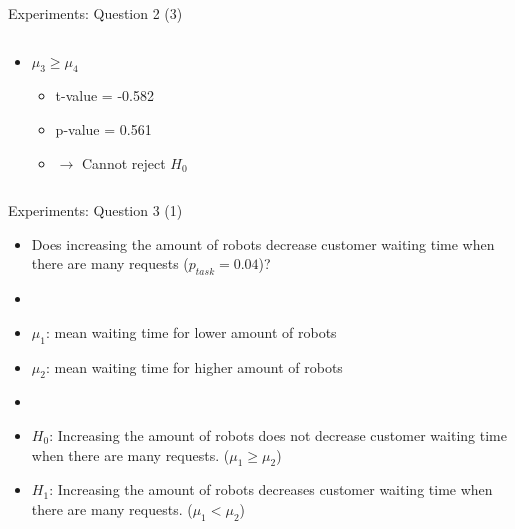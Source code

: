 \begin{frame}{Experiments: Question 2 (3)}
\begin{columns}
\begin{column}{0.5\textwidth}
\begin{itemize}
                \item $\mu_3 \geq \mu_4$
                    \begin{itemize}
                        \item t-value = -0.582
                        \item p-value = 0.561
                        \item $\rightarrow$ Cannot reject $H_0$
                    \end{itemize}
            \end{itemize}
        \end{column}

    \end{columns}
\end{frame}



\begin{frame}{Experiments: Question 3 (1)}
    \begin{itemize}
        \item Does increasing the amount of robots decrease customer waiting time when there are many requests ($p_{task} = 0.04$)?
        \item[]
        \item $\mu_1$: mean waiting time for lower amount of robots
        \item $\mu_2$: mean waiting time for higher amount of robots
        \item[]
        \item $H_0$: Increasing the amount of robots does not decrease customer waiting time when there are many requests. ($\mu_1 \geq \mu_2$)
        \item $H_1$: Increasing the amount of robots decreases customer waiting time when there are many requests. ($\mu_1 < \mu_2$)
    \end{itemize}
\end{frame}


